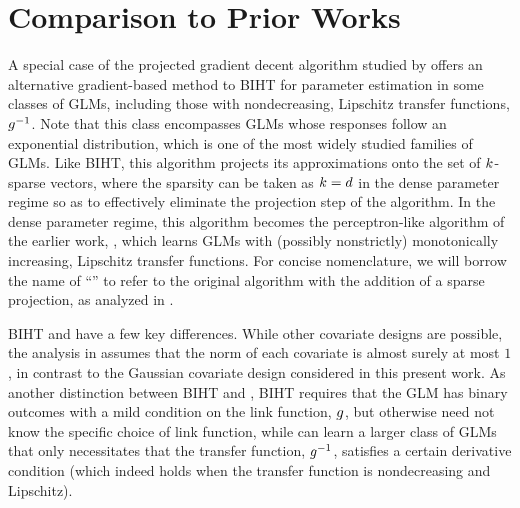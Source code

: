 \section{Comparison to Prior Works}
\label{outline:intro|>contributions|>comparison}

A special case of the projected gradient decent algorithm studied by \cite{bahmani2016learning} offers an alternative gradient-based method to BIHT for parameter estimation in some classes of GLMs, including those with nondecreasing, Lipschitz transfer functions, \(  g^{-1}  \).
Note that this class  encompasses GLMs whose responses
follow
an exponential distribution, which is one of the most widely studied families of GLMs.
Like BIHT, this algorithm projects its approximations onto the set of \(  k  \)-sparse vectors, where the sparsity can be taken as \(  k=d  \) in the dense parameter regime so as to effectively eliminate the projection step of the algorithm.
In the dense parameter regime, this algorithm becomes the perceptron-like \emph{\GLMtron} algorithm of the earlier work, \cite{kakade2011efficient}, which learns GLMs with (possibly nonstrictly) monotonically increasing, Lipschitz transfer functions.
For concise nomenclature, we will borrow the name of ``\GLMtronX'' to refer to the original \GLMtron algorithm with the addition of a sparse projection, as analyzed in \cite{bahmani2016learning}.
%
\par %
%
BIHT and \GLMtronX have a few key differences.
While other covariate designs are possible, the analysis in \cite{bahmani2016learning} assumes that the norm of each covariate is almost surely at most \(  1  \), in contrast to the Gaussian covariate design considered in this present work.
As another distinction
between BIHT and \GLMtronX, BIHT requires that the GLM has binary outcomes with a mild condition on the link function, \(  g  \), but otherwise need not know the specific choice of link function, while \GLMtron can learn a larger class of GLMs that only necessitates that the transfer function, \(  g^{-1}  \), satisfies a certain derivative condition (which indeed holds when the transfer function is nondecreasing and Lipschitz).
